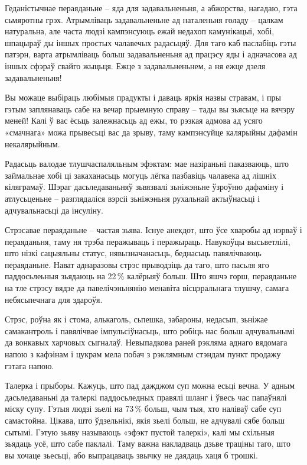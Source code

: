 Геданістычнае пераяданьне – яда для задавальненьня, а абжорства, нагадаю, гэта сьмяротны грэх. Атрымліваць задавальненьне ад наталеньня голаду – цалкам натуральна, але часта людзі кампэнсуюць ежай недахоп камунікацыі, хобі, шпацыраў ды іншых простых чалавечых радасьцяў. Для таго каб паслабіць гэты патэрн, варта атрымліваць больш задавальненьня ад працэсу яды і адначасова ад іншых сфэраў свайго жыцьця. Ежце з задавальненьнем, а ня ежце дзеля задавальненьня!

Вы можаце выбіраць любімыя прадукты і даваць яркія назвы стравам, і пры гэтым заплянаваць сабе на вечар прыемную справу – тады вы зьясьце на вячэру меней! Калі ў вас ёсьць залежнасьць ад ежы, то рэзкая адмова ад усяго «смачнага» можа прывесьці вас да зрыву, таму кампэнсуйце калярыйны дафамін некалярыйным.

Радасьць валодае тлушчаспаляльным эфэктам: мае назіраньні паказваюць, што займальнае хобі ці закаханасьць могуць лёгка пазбавіць чалавека ад лішніх кіляграмаў. Шэраг дасьледаваньняў зьвязвалі зьніжэньне ўзроўню дафаміну і атлусьценьне – разглядаліся вэрсіі зьніжэньня рухальнай актыўнасьці і адчувальнасьці да інсуліну.

Стрэсавае пераяданьне – частая зьява. Існуе анекдот, што ўсе хваробы ад нэрваў і пераяданьня, таму ня трэба перажываць і перажыраць. Навукоўцы высьветлілі, што нізкі сацыяльны статус, нявызначанасьць, беднасьць павялічваюць пераяданьне. Нават аднаразовы стрэс прыводзіць да таго, што пасьля яго паддосьлеьныя зьядаюць на 22\,\% калёрыяў больш. Што яшчэ горш, пераяданьне на тле стрэсу вядзе да павелічэньнянію менавіта вісцэральнага тлушчу, самага небясьпечнага для здароўя.

Стрэс, роўна як і стома, алькаголь, сьпешка, забароны, недасып, зьніжае самакантроль і павялічвае імпульсіўнасьць, што робіць нас больш адчувальнымі да вонкавых харчовых сыгналаў. Невыпадкова раней рэкляма аднаго вядомага напою з кафэінам і цукрам мела побач з рэклямным стэндам пункт продажу гэтага напою.

Талерка і прыборы. Кажуць, што пад дажджом суп можна есьці вечна. У адным дасьледаваньні да талеркі паддосьледных правялі шланг і ўвесь час папаўнялі міску супу. Гэтыя людзі зьелі на 73\,\% больш, чым тыя, хто наліваў сабе суп самастойна. Цікава, што ўдзельнікі, якія зьелі больш, не адчувалі сябе больш сытымі. Гэтую зьяву называюць «эфэкт пустой талеркі», калі мы схільныя зьядаць усё, што сабе паклалі. Таму важна накладваць дзьве траціны таго, што вы хочаце зьесьці, або выпрацаваць звычку не даядаць хаця б трошкі.


